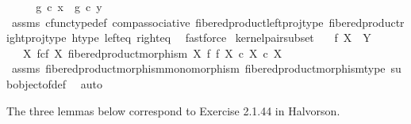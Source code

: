 \begin{isabellebody}
\isanewline
\ \ \isamarkupfalse%
\ \isamarkupfalse%
\ {\isachardoublequoteopen}g\ {\isasymcirc}\isactrlsub c\ x\ {\isacharequal}{\kern0pt}\ g\ {\isasymcirc}\isactrlsub c\ y{\isachardoublequoteclose}\isanewline
\ \ \ \ \isamarkupfalse%
\ assms{\isacharparenleft}{\kern0pt}{}{\isacharcomma}{\kern0pt}{}{\isacharcomma}{\kern0pt}{}{\isacharparenright}{\kern0pt}\ cfunc{\isacharunderscore}{\kern0pt}type{\isacharunderscore}{\kern0pt}def\ comp{\isacharunderscore}{\kern0pt}associative\ fibered{\isacharunderscore}{\kern0pt}product{\isacharunderscore}{\kern0pt}left{\isacharunderscore}{\kern0pt}proj{\isacharunderscore}{\kern0pt}type\ fibered{\isacharunderscore}{\kern0pt}product{\isacharunderscore}{\kern0pt}right{\isacharunderscore}{\kern0pt}proj{\isacharunderscore}{\kern0pt}type\ h{\isacharunderscore}{\kern0pt}type\ left{\isacharunderscore}{\kern0pt}eq\ right{\isacharunderscore}{\kern0pt}eq\ \isamarkupfalse%
\ fastforce\isanewline
{}\isamarkupfalse%
%
\endisatagproof
{\isafoldproof}%
%
\isadelimproof
\isanewline
%
\endisadelimproof
\isanewline
{}\isamarkupfalse%
\ kernel{\isacharunderscore}{\kern0pt}pair{\isacharunderscore}{\kern0pt}subset{\isacharcolon}{\kern0pt}\isanewline
\ \ \ {\isachardoublequoteopen}f{\isacharcolon}{\kern0pt}\ X\ {\isasymrightarrow}\ Y{\isachardoublequoteclose}\isanewline
\ \ \ {\isachardoublequoteopen}{\isacharparenleft}{\kern0pt}X\ \isactrlbsub f\isactrlesub {\isasymtimes}\isactrlsub c\isactrlbsub f\isactrlesub \ X{\isacharcomma}{\kern0pt}\ fibered{\isacharunderscore}{\kern0pt}product{\isacharunderscore}{\kern0pt}morphism\ X\ f\ f\ X{\isacharparenright}{\kern0pt}\ {\isasymsubseteq}\isactrlsub c\ X\ {\isasymtimes}\isactrlsub c\ X{\isachardoublequoteclose}\isanewline
%
\isadelimproof
\ \ %
\endisadelimproof
%
\isatagproof
{}\isamarkupfalse%
\ assms\ fibered{\isacharunderscore}{\kern0pt}product{\isacharunderscore}{\kern0pt}morphism{\isacharunderscore}{\kern0pt}monomorphism\ fibered{\isacharunderscore}{\kern0pt}product{\isacharunderscore}{\kern0pt}morphism{\isacharunderscore}{\kern0pt}type\ subobject{\isacharunderscore}{\kern0pt}of{\isacharunderscore}{\kern0pt}def{}\ \isamarkupfalse%
\ auto%
\endisatagproof
{\isafoldproof}%
%
\isadelimproof
%
\endisadelimproof
%
\begin{isamarkuptext}%
The three lemmas below correspond to Exercise 2.1.44 in Halvorson.%
\end{isamarkuptext}\isamarkuptrue%

\end{isabellebody}
